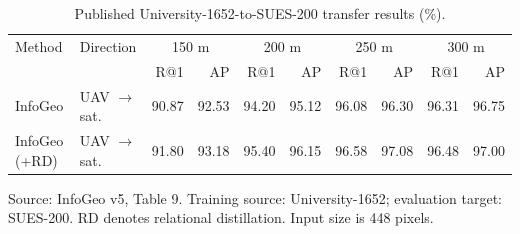 \begin{table}[t]
\centering
\caption{Published University-1652-to-SUES-200 transfer results (\%).}
\label{tab:literature_transfer}
\fontsize{9}{10.5}\selectfont
\setlength{\tabcolsep}{3.3pt}
\renewcommand{\arraystretch}{1.12}
\begin{tabular}{llrrrrrrrr}
\toprule
Method & Direction & \multicolumn{2}{c}{150 m} & \multicolumn{2}{c}{200 m} & \multicolumn{2}{c}{250 m} & \multicolumn{2}{c}{300 m} \\
\cmidrule(lr){3-4}\cmidrule(lr){5-6}\cmidrule(lr){7-8}\cmidrule(lr){9-10} & & R@1 & AP & R@1 & AP & R@1 & AP & R@1 & AP \\
\midrule
InfoGeo \cite{infogeo2026} & UAV $\rightarrow$ sat. & 90.87 & 92.53 & 94.20 & 95.12 & 96.08 & 96.30 & 96.31 & 96.75 \\
InfoGeo (+RD) \cite{infogeo2026} & UAV $\rightarrow$ sat. & 91.80 & 93.18 & 95.40 & 96.15 & 96.58 & 97.08 & 96.48 & 97.00 \\
\bottomrule
\end{tabular}
\par\vspace{2pt}\begin{minipage}{\textwidth}\fontsize{9}{10.5}\selectfont Source: InfoGeo v5, Table 9. Training source: University-1652; evaluation target: SUES-200. RD denotes relational distillation. Input size is 448 pixels.\end{minipage}
\end{table}
